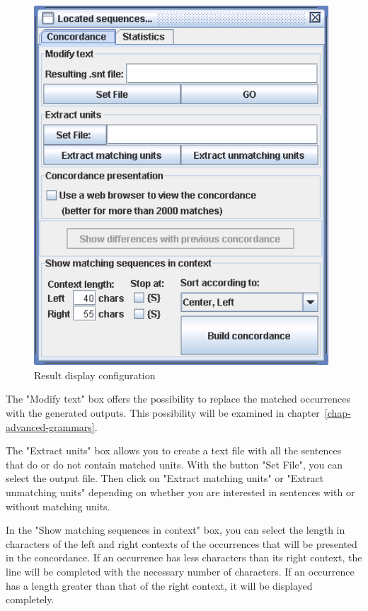 \bigskip
\begin{figure}[h]
\begin{center}
\includegraphics[width=11cm]{resources/img/fig4-6.png}
\caption{Result display configuration\label{fig-configuration-concordance}}
\end{center}
\end{figure}

\bigskip
\noindent The "Modify text" box offers the possibility to replace the matched
occurrences with the generated outputs. This possibility will be examined in 
chapter~\ref{chap-advanced-grammars}.

\bigskip
\noindent The "Extract units" box allows you to create a text file with all
the sentences that do or do not contain matched units. With the button "Set File",
you can select the output file. Then click on "Extract matching units" or
"Extract unmatching units" depending on whether you are interested in sentences
with or without matching units.

\bigskip
\noindent In the "Show matching sequences in context" box, you can select the
length in characters of the left and right contexts of the occurrences that will be
presented in the concordance. If an occurrence has less characters than its
right context, the line will be completed with the necessary number of
characters. If an occurrence has a length greater than that of the right
context, it will be displayed completely.

